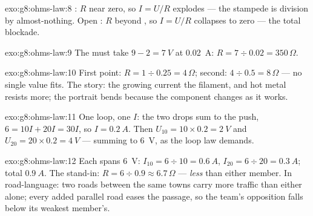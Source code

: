 \begin{solution}{exo:g8:ohms-law:8}
: $R$ near zero, so $I = U/R$ explodes --- the
stampede is division by almost-nothing. Open : $R$
beyond , so $I = U/R$ collapses to zero --- the total
blockade.
\end{solution}

\begin{solution}{exo:g8:ohms-law:9}
The  must take $9 - 2 = \qty{7}{V}$ at \qty{0.02}{A}:
$R = 7 \div 0.02 = 350\,\Omega$.
\end{solution}

\begin{solution}{exo:g8:ohms-law:10}
First point: $R = 1 \div 0.25 = 4\,\Omega$; second: $4 \div
0.5 = 8\,\Omega$ --- no single value fits. The story: the
growing current  the filament, and hot metal resists
more; the portrait bends because the component changes as it
works.
\end{solution}

\begin{solution}{exo:g8:ohms-law:11}
One loop, one $I$: the two drops sum to the  push,
$6 = 10 I + 20 I = 30 I$, so $I = \qty{0.2}{A}$. Then $U_{10}
= 10 \times 0.2 = \qty{2}{V}$ and $U_{20} = 20 \times 0.2 =
\qty{4}{V}$ --- summing to \qty{6}{V}, as the loop law
demands.
\end{solution}

\begin{solution}{exo:g8:ohms-law:12}
Each  spans \qty{6}{V}: $I_{10} = 6 \div 10 =
\qty{0.6}{A}$, $I_{20} = 6 \div 20 = \qty{0.3}{A}$; total
$\qty{0.9}{A}$. The stand-in: $R = 6 \div 0.9 \approx
6.7\,\Omega$ --- \emph{less} than either member. In
road-language: two roads between the same towns carry more
traffic than either alone; every added parallel road eases
the passage, so the team's opposition falls below its
weakest member's.
\end{solution}

